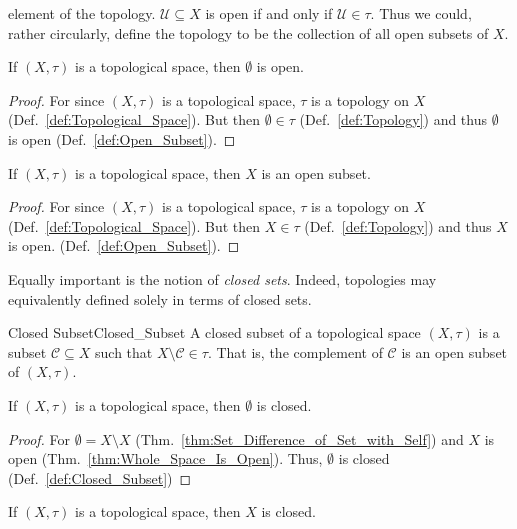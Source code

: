     element of the topology. $\mathcal{U}\subseteq{X}$ is open if and only if
    $\mathcal{U}\in\tau$. Thus we could, rather circularly, define the topology
    to be the collection of all open subsets of $X$.
    \begin{theorem}
        \label{thm:Emptyset_Is_Open}%
        If $(X,\tau)$ is a topological space, then $\emptyset$ is open.
    \end{theorem}
    \begin{proof}
        For since $(X,\tau)$ is a topological space, $\tau$ is a topology on $X$
        (Def.~\ref{def:Topological_Space}). But then $\emptyset\in\tau$
        (Def.~\ref{def:Topology}) and thus $\emptyset$ is open
        (Def.~\ref{def:Open_Subset}).
    \end{proof}
    \begin{theorem}
        \label{thm:Whole_Space_Is_Open}%
        If $(X,\tau)$ is a topological space, then $X$ is an open subset.
    \end{theorem}
    \begin{proof}
        For since $(X,\tau)$ is a topological space, $\tau$ is a topology on $X$
        (Def.~\ref{def:Topological_Space}). But then
        $X\in\tau$ (Def.~\ref{def:Topology}) and thus $X$ is open.
        (Def.~\ref{def:Open_Subset}).
    \end{proof}
    Equally important is the notion of \textit{closed sets}. Indeed, topologies
    may equivalently defined solely in terms of closed sets.
    \begin{fdefinition}{Closed Subset}{Closed_Subset}
        A closed subset of a \gls{topological space} $(X,\tau)$ is a
        \gls{subset} $\mathcal{C}\subseteq{X}$ such that
        $X\setminus\mathcal{C}\in\tau$. That is, the complement of $\mathcal{C}$
        is an open subset of $(X,\tau)$.
    \end{fdefinition}
    \begin{theorem}
        \label{thm:Emptyset_Is_Closed}%
        If $(X,\tau)$ is a topological space, then $\emptyset$ is closed.
    \end{theorem}
    \begin{proof}
        For $\emptyset=X\setminus{X}$
        (Thm.~\ref{thm:Set_Difference_of_Set_with_Self}) and $X$ is open
        (Thm.~\ref{thm:Whole_Space_Is_Open}). Thus, $\emptyset$ is closed
        (Def.~\ref{def:Closed_Subset})
    \end{proof}
    \begin{theorem}
        \label{thm:Whole_Space_Is_Closed}%
        If $(X,\tau)$ is a topological space, then $X$ is closed.
    \end{theorem}
